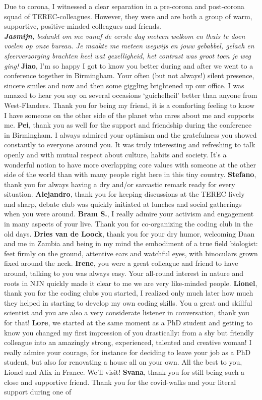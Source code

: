 \documentclass[10pt, twoside]{book} %
\begin{document}
\begin{small}
Due to corona, I witnessed a clear separation in a pre-corona and post-corona squad of TEREC-colleagues. However, they were and are both a group of warm, supportive, positive-minded colleagues and friends.\\

\textit{\textbf{Jasmijn}, bedankt om me vanaf de eerste dag meteen welkom en thuis te doen voelen op onze bureau. Je maakte me meteen wegwijs en jouw gebabbel, gelach en sfeerverzorging brachten heel wat gezelligheid, het contrast was groot toen je weg ging!} \textbf{Jiao}, I'm so happy I got to know you better during and after we went to a conference together in Birmingham. Your often (but not always!) silent presence, sincere smiles and now and then some giggling brightened up our office. I was amazed to hear you say on several occasions `guichelheil' better than anyone from West-Flanders. Thank you for being my friend, it is a comforting feeling to know I have someone on the other side of the planet who cares about me and supports me. \textbf{Pei}, thank you as well for the support and friendship during the conference in Birmingham. I always admired your optimism and the gratefulness you showed constantly to everyone around you. It was truly interesting and refreshing to talk openly and with mutual respect about culture, habits and society. It's a wonderful notion to have more overlapping core values with someone at the other side of the world than with many people right here in this tiny country. \textbf{Stefano}, thank you for always having a dry and/or sarcastic remark ready for every situation. \textbf{Alejandro}, thank you for keeping discussions at the TEREC lively and sharp, debate club was quickly initiated at lunches and social gatherings when you were around. \textbf{Bram S.}, I really admire your activism and engagement in many aspects of your live. Thank you for co-organizing the coding club in the old days. \textbf{Dries van de Loock}, thank you for your dry humor, welcoming Daan and me in Zambia and being in my mind the embodiment of a true field biologist: feet firmly on the ground, attentive ears and watchful eyes, with binoculars grown fixed around the neck. \textbf{Irene}, you were a great colleague and friend to have around, talking to you was always easy. Your all-round interest in nature and roots in NJN quickly made it clear to me we are very like-minded people. \textbf{Lionel}, thank you for the coding clubs you started, I realized only much later how much they helped in starting to develop my own coding skills. You a great and skillful scientist and you are also a very considerate listener in conversation, thank you for that! \textbf{Lore}, we started at the same moment as a PhD student and getting to know you changed my first impression of you drastically: from a shy but friendly colleague into an amazingly strong, experienced, talented and creative woman! I really admire your courage, for instance for deciding to leave your job as a PhD student, but also for renovating a house all on your own. All the best to you, Lionel and Alix in France. We'll visit! \textbf{Svana}, thank you for still being such a close and supportive friend. Thank you for the covid-walks and your literal support during one of 
\end{small}
\end{document}
